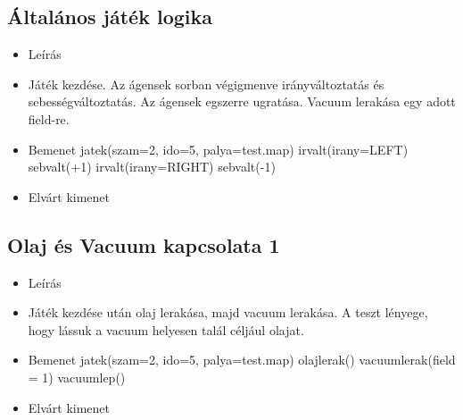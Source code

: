 \subsection{Általános játék logika}
\begin{itemize}
	\item Leírás\newline
	\item Játék kezdése. Az ágensek sorban végigmenve irányváltoztatás és sebességváltoztatás. Az ágensek egszerre ugratása. Vacuum lerakása egy adott field-re.
	\item Bemenet\newline
		jatek(szam=2, ido=5, palya=test.map) \newline
		irvalt(irany=LEFT) \newline
		sebvalt(+1) \newline
		irvalt(irany=RIGHT) \newline
		sebvalt(-1) \newline
	\item Elvárt kimenet\newline
\end{itemize}

\subsection{Olaj és Vacuum kapcsolata 1}
\begin{itemize}
	\item Leírás\newline
	\item Játék kezdése után olaj lerakása, majd vacuum lerakása. A teszt lényege, hogy lássuk a vacuum helyesen talál céljául olajat.
	\item Bemenet\newline
		jatek(szam=2, ido=5, palya=test.map) \newline
		olajlerak() \newline
		vacuumlerak(field = 1) \newline
		vacuumlep() \newline
	\item Elvárt kimenet\newline
\end{itemize}

